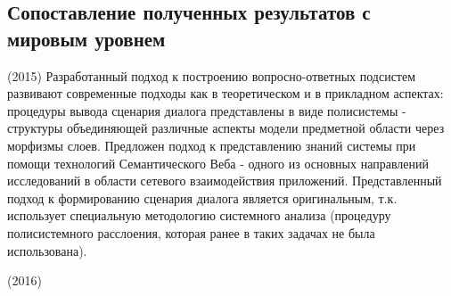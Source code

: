 \documentclass[12pt,a4paper]{ltxdoc}
\begin{document}
\subsection{Сопоставление полученных результатов с мировым уровнем}
(2015) Разработанный подход к построению вопросно-ответных подсистем развивают современные подходы как в теоретическом и в прикладном аспектах: процедуры вывода сценария диалога представлены в виде полисистемы - структуры объединяющей различные аспекты модели предметной области через морфизмы слоев. Предложен подход к представлению знаний системы при помощи технологий Семантического Веба - одного из основных направлений исследований в области сетевого взаимодействия приложений. Представленный подход к формированию сценария диалога является оригинальным, т.к. использует специальную методологию системного анализа (процедуру полисистемного расслоения, которая ранее в таких задачах не была использована).

(2016)
\end{document}
